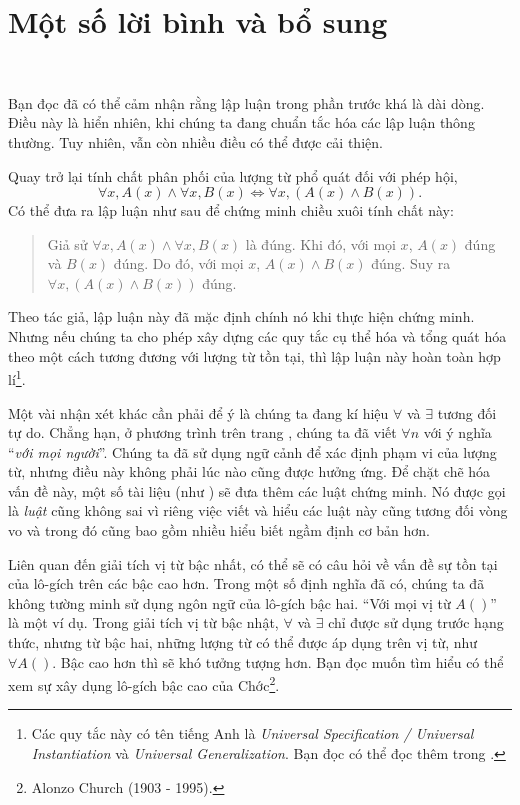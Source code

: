 \section{Một số lời bình và bổ sung}

\ %

Bạn đọc đã có thể cảm nhận rằng lập luận trong phần trước khá là dài dòng. Điều này là hiển nhiên, khi chúng ta đang chuẩn tắc hóa các lập luận thông thường. Tuy nhiên, vẫn còn nhiều điều có thể được cải thiện.

Quay trở lại tính chất phân phối của lượng từ phổ quát đối với phép hội,
\begin{equation*}
   \forall x, A(x) \land \forall x, B(x) \iff \forall x, (A(x) \land B(x)).
\end{equation*}
Có thể đưa ra lập luận như sau để chứng minh chiều xuôi tính chất này:
\begin{quotation}
   Giả sử $\forall x, A(x) \land \forall x, B(x)$ là đúng. Khi đó, với mọi $x$, $A(x)$ đúng và $B(x)$ đúng. Do đó, với mọi $x$, $A(x) \land B(x)$ đúng. Suy ra $\forall x, (A(x) \land B(x))$ đúng.
\end{quotation}
Theo tác giả, lập luận này đã mặc định chính nó khi thực hiện chứng minh. Nhưng nếu chúng ta cho phép xây dựng các quy tắc cụ thể hóa và tổng quát hóa theo một cách tương đương với lượng từ tồn tại, thì lập luận này hoàn toàn hợp lí\footnote{Các quy tắc này có tên tiếng Anh là \emph{Universal Specification / Universal Instantiation} và \emph{Universal Generalization}. Bạn đọc có thể đọc thêm trong \cite{suppes2012introduction}.}.

Một vài nhận xét khác cần phải để ý là chúng ta đang kí hiệu $\forall$ và $\exists$ tương đối tự do. Chẳng hạn, ở phương trình  trên trang \pageref{eq:nen_tang_lo_gich:giai_tich_vi_tu_bac_nhat:thanh_to_cau_tao:ex-1}, chúng ta đã viết $\forall n$ với ý nghĩa ``\textit{với mọi người}''. Chúng ta đã sử dụng ngữ cảnh để xác định phạm vi của lượng từ, nhưng điều này không phải lúc nào cũng được hưởng ứng. Để chặt chẽ hóa vấn đề này, một số tài liệu (như \cite{suppes2012introduction}) sẽ đưa thêm các luật chứng minh. Nó được gọi là \emph{luật} cũng không sai vì riêng việc viết và hiểu các luật này cũng tương đối vòng vo và trong đó cũng bao gồm nhiều hiểu biết ngầm định cơ bản hơn.

Liên quan đến giải tích vị từ bậc nhất, có thể sẽ có câu hỏi về vấn đề sự tồn tại của lô-gích trên các bậc cao hơn. Trong một số định nghĩa đã có, chúng ta đã không tường minh sử dụng ngôn ngữ của lô-gích bậc hai. ``Với mọi vị từ $A()$'' là một ví dụ. Trong giải tích vị từ bậc nhật, $\forall$ và $\exists$ chỉ được sử dụng trước hạng thức, nhưng từ bậc hai, những lượng từ có thể được áp dụng trên vị từ, như $\forall A()$. Bậc cao hơn thì sẽ khó tưởng tượng hơn. Bạn đọc muốn tìm hiểu có thể xem sự xây dụng lô-gích bậc cao của Chớc\footnote{Alonzo Church (1903 - 1995).}.


